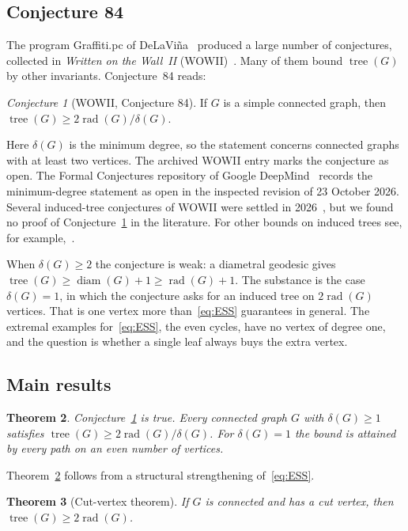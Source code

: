 \documentclass[11pt,a4paper]{article}
\newtheorem{theorem}{Theorem}[section]
\theoremstyle{remark}
\newtheorem{conjecture}[theorem]{Conjecture}
\newcommand{\rad}{\operatorname{rad}}
\newcommand{\diam}{\operatorname{diam}}
\newcommand{\tr}{\tree}
\newcommand{\tree}{\operatorname{tree}}
\begin{document}
\subsection{Conjecture 84}

The program Graffiti.pc of DeLaVi\~na~\cite{DeL05} produced a large number of conjectures, collected in \emph{Written on the Wall~II} (WOWII)~\cite{WOWII}. Many of them bound $\tr(G)$ by other invariants. Conjecture~84 reads:

\begin{conjecture}[WOWII, Conjecture 84]\label{conj:84}
If $G$ is a simple connected graph, then $\tr(G)\ge 2\rad(G)/\delta(G)$.
\end{conjecture}

Here $\delta(G)$ is the minimum degree, so the statement concerns connected graphs with at least two vertices. The archived WOWII entry marks the conjecture as open. The Formal Conjectures repository of Google DeepMind~\cite{FC} records the minimum-degree statement as open in the inspected revision of 23 October 2026. Several induced-tree conjectures of WOWII were settled in 2026~\cite{Fer26,Mak}, but we found no proof of Conjecture~\ref{conj:84} in the literature. For other bounds on induced trees see, for example,~\cite{FLS09}.

When $\delta(G)\ge2$ the conjecture is weak: a diametral geodesic gives $\tr(G)\ge\diam(G)+1\ge\rad(G)+1$. The substance is the case $\delta(G)=1$, in which the conjecture asks for an induced tree on $2\rad(G)$ vertices. That is one vertex more than~\eqref{eq:ESS} guarantees in general. The extremal examples for~\eqref{eq:ESS}, the even cycles, have no vertex of degree one, and the question is whether a single leaf always buys the extra vertex.

\subsection{Main results}

\begin{theorem}\label{thm:84}
Conjecture~\ref{conj:84} is true. Every connected graph $G$ with $\delta(G)\ge1$ satisfies $\tr(G)\ge 2\rad(G)/\delta(G)$. For $\delta(G)=1$ the bound is attained by every path on an even number of vertices.
\end{theorem}

Theorem~\ref{thm:84} follows from a structural strengthening of~\eqref{eq:ESS}.

\begin{theorem}[Cut-vertex theorem]\label{thm:cut}
If $G$ is connected and has a cut vertex, then $\tr(G)\ge 2\rad(G)$.
\end{theorem}
\end{document}
